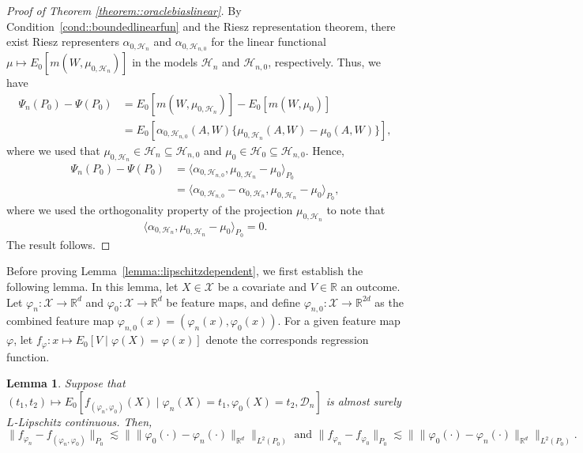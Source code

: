 \documentclass[11pt]{article}
\newtheorem{lemma}{Lemma}
\theoremstyle{definition}
\begin{document}
\begin{proof}[Proof of Theorem \ref{theorem::oraclebiaslinear}]
By Condition~\ref{cond::boundedlinearfun} and the Riesz representation theorem, there exist Riesz representers $\alpha_{0,\mathcal{H}_{n}}$ and $\alpha_{0,\mathcal{H}_{n,0}}$ for the linear functional $\mu \mapsto E_0[m(W, \mu_{0, \mathcal{H}_n})]$ in the models $\mathcal{H}_{n}$ and $\mathcal{H}_{n,0}$, respectively. Thus, we have
\begin{align*}
    \Psi_n(P_0) - \Psi(P_0) 
    &= E_0[m(W, \mu_{0, \mathcal{H}_n})] - E_0[m(W, \mu_{0})] \\
    &= E_0[\alpha_{0,\mathcal{H}_{n,0}}(A,W)\{\mu_{0, \mathcal{H}_n}(A,W) - \mu_{0}(A,W)\}],
\end{align*}
where we used that $\mu_{0, \mathcal{H}_n} \in \mathcal{H}_n \subseteq \mathcal{H}_{n,0}$ and $\mu_0 \in \mathcal{H}_0 \subseteq \mathcal{H}_{n,0}$. Hence,
\begin{align*}
    \Psi_n(P_0) - \Psi(P_0) 
    &= \langle \alpha_{0,\mathcal{H}_{n,0}}, \mu_{0, \mathcal{H}_n} - \mu_{0} \rangle_{P_0} \\
    &= \langle \alpha_{0,\mathcal{H}_{n,0}} - \alpha_{0,\mathcal{H}_{n}}, \mu_{0, \mathcal{H}_n} - \mu_{0} \rangle_{P_0},
\end{align*}
where we used the orthogonality property of the projection $\mu_{0, \mathcal{H}_n}$ to note that
\[
\langle \alpha_{0,\mathcal{H}_{n}}, \mu_{0, \mathcal{H}_n} - \mu_{0} \rangle_{P_0} = 0.
\]
The result follows.
\end{proof}





Before proving Lemma~\ref{lemma::lipschitzdependent}, we first establish the following lemma. In this lemma, let \(X \in \mathcal{X}\) be a covariate and \(V \in \mathbb{R}\) an outcome. Let \(\varphi_n: \mathcal{X} \to \mathbb{R}^d\) and \(\varphi_0: \mathcal{X} \to \mathbb{R}^d\) be feature maps, and define \(\varphi_{n,0}: \mathcal{X} \to \mathbb{R}^{2d}\) as the combined feature map \(\varphi_{n,0}(x) = (\varphi_n(x), \varphi_0(x))\). For a given feature map \(\varphi\), let \(f_{\varphi}: x \mapsto E_0[V \mid \varphi(X) =  \varphi(x) ]\) denote the corresponds regression function.


 

\begin{lemma}
      \label{lemma::lipschitzdependent2} Suppose that $(t_1, t_2) \mapsto E_0[f_{(\varphi_n, \varphi_0)}(X) \mid \varphi_n(X) = t_1, \varphi_0(X) = t_2, \mathcal{D}_n]$ is almost surely $L$-Lipschitz continuous. Then,
   $$\|f_{\varphi_n} - f_{(\varphi_n, \varphi_0)} \|_{P_0} \lesssim  \|\|\varphi_0(\cdot) - \varphi_n(\cdot)\|_{\mathbb{R}^d} \|_{L^2(P_0)}  \text{ and } \|f_{\varphi_n} - f_{\varphi_0} \|_{P_0} \lesssim  \|\|\varphi_0(\cdot) - \varphi_n(\cdot)\|_{\mathbb{R}^d} \|_{L^2(P_0)}.$$
\end{lemma}
\end{document}
